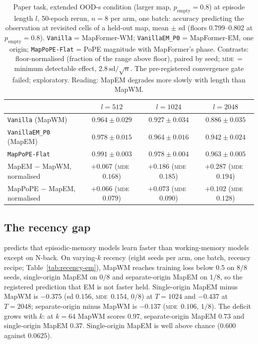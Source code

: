 \documentclass[10pt]{article}
\newcommand{\mde}{\textsc{mde}}
\newcommand{\arm}[1]{\texttt{#1}}
\begin{document}
\begin{table}[t]
\centering
\small
\captionsetup{font=footnotesize,skip=4pt}
\caption{Paper task, extended OOD-s condition (larger map, $p_{\mathrm{empty}}=0.8$) at episode length $l$, 50-epoch rerun, $n=8$ per arm, one batch: accuracy predicting the observation at revisited cells of a held-out map, mean $\pm$ sd (floors 0.799--0.802 at $p_{\mathrm{empty}}=0.8$). \arm{Vanilla} = MapFormer-WM; \arm{VanillaEM\_P0} = MapFormer-EM, one origin; \arm{MapPoPE-Flat} = PoPE magnitude with MapFormer's phase. Contrasts: floor-normalised (fraction of the range above floor), paired by seed; \mde\ = minimum detectable effect, $2.8\,\mathrm{sd}/\sqrt{n}$. The pre-registered convergence gate failed; exploratory. Reading: MapEM degrades more slowly with length than MapWM.}
\label{tab:papertask-em}
\begin{tabular}{@{}lccc@{}}
\toprule
 & $l=512$ & $l=1024$ & $l=2048$ \\
\midrule
\arm{Vanilla} (MapWM)          & $0.964\pm0.029$ & $0.927\pm0.034$ & $0.886\pm0.035$ \\
\arm{VanillaEM\_P0} (MapEM)    & $0.978\pm0.015$ & $0.964\pm0.016$ & $0.942\pm0.024$ \\
\arm{MapPoPE-Flat}             & $0.991\pm0.003$ & $0.978\pm0.004$ & $0.963\pm0.005$ \\
\midrule
MapEM $-$ MapWM, normalised    & $+0.067$ (\mde\ $0.168$) & $+0.186$ (\mde\ $0.185$) & $+0.287$ (\mde\ $0.194$) \\
MapPoPE $-$ MapEM, normalised  & $+0.066$ (\mde\ $0.079$) & $+0.073$ (\mde\ $0.090$) & $+0.102$ (\mde\ $0.128$) \\
\bottomrule
\end{tabular}
\end{table}

\subsection{The recency gap}
\label{sec:c4-gap}

\citet{whittington2025tale} predicts that episodic-memory models learn faster than working-memory models
except on N-back. On varying-$k$ recency (eight seeds per arm, one batch, recency recipe;
Table~\ref{tab:recency-em}), MapWM reaches training loss below 0.5 on $8/8$ seeds, single-origin MapEM on
$0/8$ and separate-origin MapEM on $1/8$, so the registered prediction that EM is not faster held.
Single-origin MapEM minus MapWM is $-0.375$ (sd $0.156$, \mde\ $0.154$, $0/8$) at $T=1024$ and $-0.437$ at
$T=2048$; separate-origin minus MapWM is $-0.137$ (\mde\ $0.106$, $1/8$). The deficit grows with $k$: at
$k=64$ MapWM scores $0.97$, separate-origin MapEM $0.73$ and single-origin MapEM $0.37$. Single-origin
MapEM is well above chance ($0.600$ against $0.0625$). %
\end{document}
